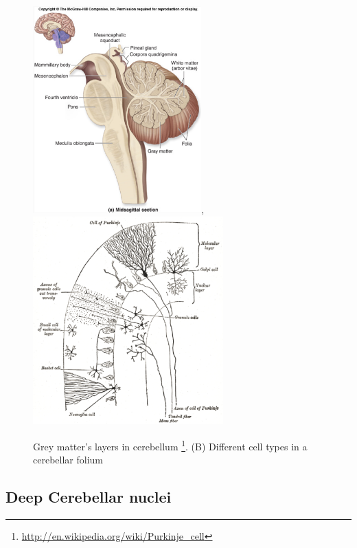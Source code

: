 \begin{figure}[hbt]
  \centerline{\includegraphics[height=8cm,
    angle=0]{./images/brain_10.eps},
    \includegraphics[height=8cm,
    angle=0]{./images/cerebellar-folium-neurons.eps}}
  \caption{Grey matter's layers in cerebellum
  \footnote{\url{http://en.wikipedia.org/wiki/Purkinje_cell}}. (B) Different
  cell types in a cerebellar folium}
\label{fig:cerebellum_greymatter}
\end{figure}

\subsection{Deep Cerebellar nuclei}
\label{sec:deep_cerebellar_nucle}

